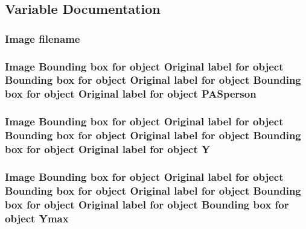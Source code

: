 \subsection{Variable Documentation}
\subsubsection[{\texorpdfstring{filename}{filename}}]{\setlength{\rightskip}{0pt plus 5cm}Image filename}\hypertarget{crop001501_8txt_a8fb7cd54abaa35f0affcd036288e33b1}{}\label{crop001501_8txt_a8fb7cd54abaa35f0affcd036288e33b1}
\subsubsection[{\texorpdfstring{P\+A\+Sperson}{PASperson}}]{\setlength{\rightskip}{0pt plus 5cm}Image Bounding box for object Original label for object Bounding box for object Original label for object Bounding box for object Original label for object P\+A\+Sperson}\hypertarget{crop001501_8txt_a7bd1d59df79b5bb0f1d4d2d878fb9b50}{}\label{crop001501_8txt_a7bd1d59df79b5bb0f1d4d2d878fb9b50}
\subsubsection[{\texorpdfstring{Y}{Y}}]{\setlength{\rightskip}{0pt plus 5cm}Image Bounding box for object Original label for object Bounding box for object Original label for object Bounding box for object Original label for object Y}\hypertarget{crop001501_8txt_a4579792d3e0006e510605fab50fceeb3}{}\label{crop001501_8txt_a4579792d3e0006e510605fab50fceeb3}
\subsubsection[{\texorpdfstring{Ymax}{Ymax}}]{\setlength{\rightskip}{0pt plus 5cm}Image Bounding box for object Original label for object Bounding box for object Original label for object Bounding box for object Original label for object Bounding box for object Ymax}\hypertarget{crop001501_8txt_a58e61bcb66b2fad6d8338d6459484b3e}{}\label{crop001501_8txt_a58e61bcb66b2fad6d8338d6459484b3e}
